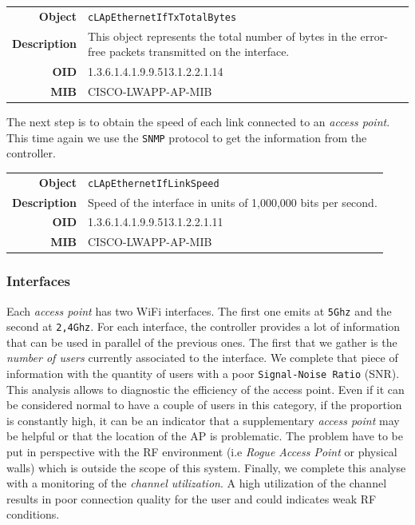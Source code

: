 \begin{tabular}{|r l|}
\hline
\textbf{Object} & \texttt{cLApEthernetIfTxTotalBytes} \\
\textbf{Description} & \parbox{11cm}{This object represents the total number of bytes in the error-free packets transmitted on the interface.} \\
\textbf{OID} & 1.3.6.1.4.1.9.9.513.1.2.2.1.14 \\
\textbf{MIB} & CISCO-LWAPP-AP-MIB \\
\hline
\end{tabular}

The next step is to obtain the speed of each link connected to an \emph{access point}. This time again we use the \texttt{SNMP} protocol to get the information from the controller.

\begin{tabular}{|r l|}
\hline
\textbf{Object} & \texttt{cLApEthernetIfLinkSpeed} \\
\textbf{Description} & \parbox{11cm}{Speed of the interface in units of 1,000,000 bits per second.} \\
\textbf{OID} & 1.3.6.1.4.1.9.9.513.1.2.2.1.11 \\
\textbf{MIB} & CISCO-LWAPP-AP-MIB \\
\hline
\end{tabular} 

\subsubsection*{Interfaces}
Each \emph{access point} has two WiFi interfaces. The first one emits at \texttt{5Ghz} and the second at \texttt{2,4Ghz}. For each interface, the controller provides a lot of information that can be used in parallel of the previous ones. The first that we gather is the \textit{number of users} currently associated to the interface. We complete that piece of information with the quantity of users with a poor \texttt{Signal-Noise Ratio} (SNR). This analysis allows to diagnostic the efficiency of the access point. Even if it can be considered normal to have a couple of users in this category, if the proportion is constantly high, it can be an indicator that a supplementary \emph{access point} may be helpful or that the location of the AP is problematic. The problem have to be put in perspective with the RF environment (i.e \emph{Rogue Access Point} or physical walls) which is outside the scope of this system. 
Finally, we complete this analyse with a monitoring of the \emph{channel utilization}. A high utilization of the channel results in poor connection quality for the user and could indicates weak RF conditions.

